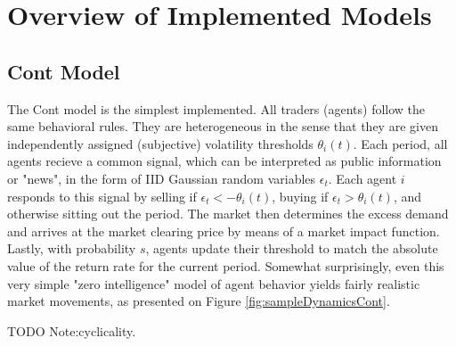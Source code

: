 \documentclass[runningheads]{llncs}
\begin{document}
\section{Overview of Implemented Models}

\subsection{Cont Model}

The Cont model \cite{cont2006} is the simplest implemented. All traders (agents) follow the same behavioral rules. They are heterogeneous in the sense that they are given independently assigned (subjective) volatility thresholds $\theta_i(t)$. Each period, all agents recieve a common signal, which can be interpreted as public information or "news", in the form of IID Gaussian random variables $\epsilon_t$. Each agent $i$ responds to this signal by selling if $\epsilon_t < -\theta_i(t)$, buying if $\epsilon_t > \theta_i(t)$, and otherwise sitting out the period. The market then determines the excess demand and arrives at the market clearing price by means of a market impact function. Lastly, with probability $s$, agents update their threshold to match the absolute value of the return rate for the current period. Somewhat surprisingly, even this very simple "zero intelligence" model of agent behavior yields fairly realistic market movements, as presented on Figure \ref{fig:sampleDynamicsCont}.

TODO Note:cyclicality.
\end{document}
